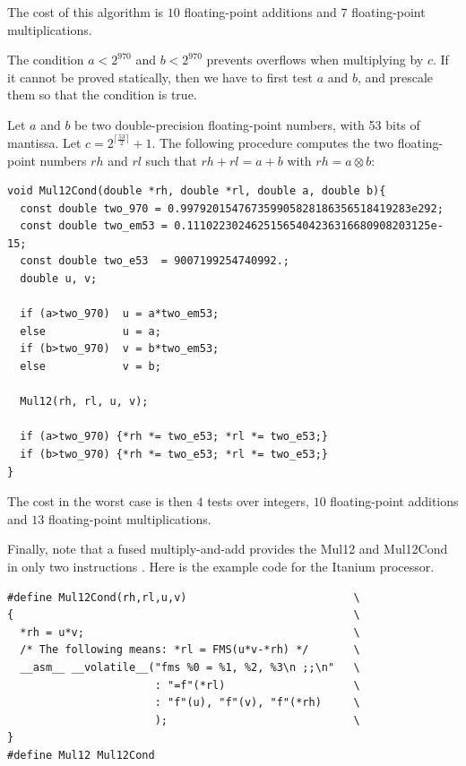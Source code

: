 The cost of this algorithm is $10$ floating-point
additions and $7$ floating-point multiplications.



The condition $a<2^{970}$ and $b<2^{970}$ prevents overflows when
multiplying by $c$. If it cannot be proved statically, then we have to
first test $a$ and $b$, and prescale them so that the condition is
true.


\begin{theorem}
  Let $a$ and $b$ be two double-precision floating-point numbers, with
  53 bits of mantissa. Let $c=2^{\lceil\frac{ 53 }{2}\rceil}+1$.
  The following procedure
  computes the two floating-point numbers $rh$ and $rl$ such that $rh
  + rl = a + b$ with $rh = a \otimes b$:

\begin{lstlisting}[label={lst:Mul12Cond},caption={Mul12Cond},firstnumber=1]
void Mul12Cond(double *rh, double *rl, double a, double b){
  const double two_970 = 0.997920154767359905828186356518419283e292;
  const double two_em53 = 0.11102230246251565404236316680908203125e-15;
  const double two_e53  = 9007199254740992.;
  double u, v;

  if (a>two_970)  u = a*two_em53; 
  else            u = a;
  if (b>two_970)  v = b*two_em53; 
  else            v = b;

  Mul12(rh, rl, u, v);

  if (a>two_970) {*rh *= two_e53; *rl *= two_e53;} 
  if (b>two_970) {*rh *= two_e53; *rl *= two_e53;} 
}\end{lstlisting}
\end{theorem}

The cost in the worst case is then $4$ tests over integers,
$10$ floating-point additions and $13$ floating-point multiplications.


Finally, note that a fused multiply-and-add provides the Mul12 and
Mul12Cond in only two instructions \cite{CorneaHarrisonTang2002}. Here
is the example code for the Itanium processor.

\begin{lstlisting}[label={lst:Mul12CondFMA},caption={Mul12 on the Itanium},firstnumber=1]
#define Mul12Cond(rh,rl,u,v)                          \
{                                                     \
  *rh = u*v;                                          \
  /* The following means: *rl = FMS(u*v-*rh) */       \
  __asm__ __volatile__("fms %0 = %1, %2, %3\n ;;\n"   \
                       : "=f"(*rl)                    \
                       : "f"(u), "f"(v), "f"(*rh)     \
                       );                             \
}
#define Mul12 Mul12Cond
\end{lstlisting}





